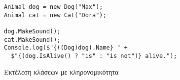 \begin{listing}[H]
\begin{verbatim}
Animal dog = new Dog("Max");
Animal cat = new Cat("Dora");

dog.MakeSound();
cat.MakeSound();
Console.log($"{((Dog)dog).Name} " +
  $"{(dog.IsAlive() ? "is" : "is not")} alive.");
\end{verbatim}
\caption{Εκτέλεση κλάσεων με κληρονομικότητα}
\label{inheritanceExec}
\end{listing}